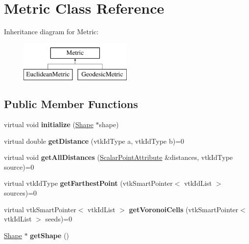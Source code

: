 \hypertarget{class_metric}{}\section{Metric Class Reference}
\label{class_metric}
Inheritance diagram for Metric\+:\begin{figure}[H]
\begin{center}
\leavevmode
\includegraphics[height=2.000000cm]{class_metric}
\end{center}
\end{figure}
\subsection*{Public Member Functions}
\begin{DoxyCompactItemize}
\item 
\hypertarget{class_metric_afa7ed1a7ecc5039c24f7dab39ecaaaf0}{}virtual void {\bfseries initialize} (\hyperlink{class_shape}{Shape} $\ast$shape)\label{class_metric_afa7ed1a7ecc5039c24f7dab39ecaaaf0}

\item 
\hypertarget{class_metric_a51b89ee4ecb69e423cb8af22582ba09c}{}virtual double {\bfseries get\+Distance} (vtk\+Id\+Type a, vtk\+Id\+Type b)=0\label{class_metric_a51b89ee4ecb69e423cb8af22582ba09c}

\item 
\hypertarget{class_metric_ae2a68e0d2a63063909b92628939df012}{}virtual void {\bfseries get\+All\+Distances} (\hyperlink{class_scalar_point_attribute}{Scalar\+Point\+Attribute} \&distances, vtk\+Id\+Type source)=0\label{class_metric_ae2a68e0d2a63063909b92628939df012}

\item 
\hypertarget{class_metric_a2f4c68531fa9470847308cfdc9c11367}{}virtual vtk\+Id\+Type {\bfseries get\+Farthest\+Point} (vtk\+Smart\+Pointer$<$ vtk\+Id\+List $>$ sources)=0\label{class_metric_a2f4c68531fa9470847308cfdc9c11367}

\item 
\hypertarget{class_metric_aee48cf03e0d8c3f08c9bf9993fe3de87}{}virtual vtk\+Smart\+Pointer$<$ vtk\+Id\+List $>$ {\bfseries get\+Voronoi\+Cells} (vtk\+Smart\+Pointer$<$ vtk\+Id\+List $>$ seeds)=0\label{class_metric_aee48cf03e0d8c3f08c9bf9993fe3de87}

\item 
\hypertarget{class_metric_aab7d021672694fbec4c0742f9f33bbe0}{}\hyperlink{class_shape}{Shape} $\ast$ {\bfseries get\+Shape} ()\label{class_metric_aab7d021672694fbec4c0742f9f33bbe0}

\end{DoxyCompactItemize}
